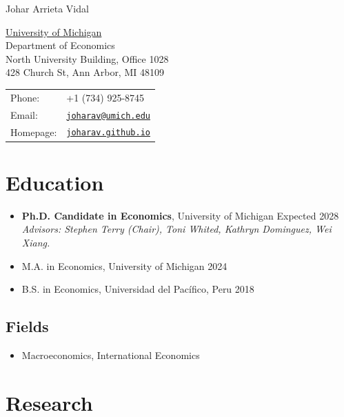 \documentclass[letterpaper]{article}
\def\name{Johar Arrieta Vidal}
\newcommand{\daterange}[1]{\hfill #1}
\begin{document}
{\huge \name}

\vspace{0.18in}

\begin{minipage}{0.48\linewidth}
  \href{https://lsa.umich.edu/econ}{University of Michigan} \\
  Department of Economics \\
  North University Building, Office 1028 \\
  428 Church St, Ann Arbor, MI 48109
\end{minipage}
\hfill
\begin{minipage}{0.48\linewidth}
  \begin{tabular}{@{}ll@{}}
    Phone: & +1 (734) 925-8745 \\
    Email: & \href{mailto:joharav@umich.edu}{\texttt{joharav@umich.edu}} \\
    Homepage: & \href{https://joharav.github.io}{\texttt{joharav.github.io}} \\
  \end{tabular}
\end{minipage}

\section*{Education}
\begin{itemize}
  \item \textbf{Ph.D. Candidate in Economics}, University of Michigan \daterange{Expected 2028} \\
        \textit{Advisors: Stephen Terry (Chair), Toni Whited, Kathryn Dominguez, Wei Xiang.}
  \item M.A. in Economics, University of Michigan \daterange{2024}
  \item B.S. in Economics, Universidad del Pac\'ifico, Peru \daterange{2018}
\end{itemize}

\subsection*{Fields}
\begin{itemize}
  \item Macroeconomics, International Economics
\end{itemize}

\section*{Research}
\end{document}
